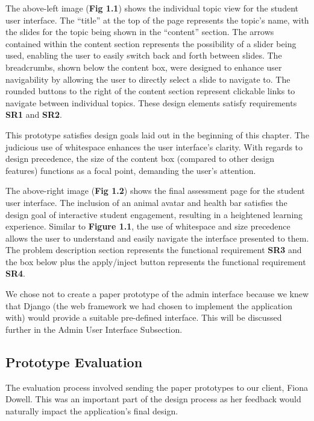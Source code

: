 \documentclass{l3proj}
\begin{document}
The above-left image (\textbf{Fig 1.1}) shows the individual topic view for the student user interface. The ``title'' at the top of the page represents the topic's name, with the slides for the topic being shown in the ``content'' section. The arrows contained within the content section represents the possibility of a slider being used, enabling the user to easily switch back and forth between slides. The breadcrumbs, shown below the content box, were designed to enhance user navigability by allowing the user to directly select a slide to navigate to. The rounded buttons to the right of the content section represent clickable links to navigate between individual topics. These design elements satisfy requirements \textbf{SR1} and \textbf{SR2}.

This prototype satisfies design goals laid out in the beginning of this chapter. The judicious use of whitespace enhances the user interface's clarity. With regards to design precedence, the size of the content box (compared to other design features) functions as a focal point, demanding the user's attention. 

The above-right image (\textbf{Fig 1.2}) shows the final assessment page for the student user interface. The inclusion of an animal avatar and health bar satisfies the design goal of interactive student engagement, resulting in a heightened learning experience. Similar to \textbf{Figure 1.1}, the use of whitespace and size precedence allows the user to understand and easily navigate the interface presented to them. The problem description section represents the functional requirement \textbf{SR3} and the box below plus the apply/inject button represents the functional requirement \textbf{SR4}.  

We chose not to create a paper prototype of the admin interface because we knew that Django (the web framework we had chosen to implement the application with) would provide a suitable pre-defined interface. This will be discussed further in the Admin User Interface Subsection. 
 
\subsection{Prototype Evaluation}

The evaluation process involved sending the paper prototypes to our client, Fiona Dowell. This was an important part of the design process as her feedback would naturally impact the application's final design. 
\end{document}
